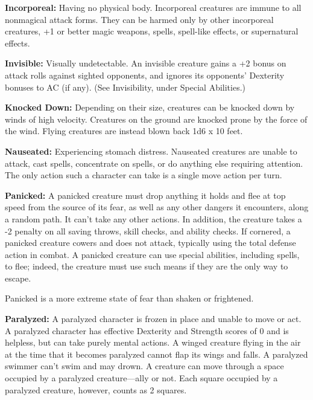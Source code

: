 \documentclass{article}
\begin{document}
\vspace{12pt}
\textbf{Incorporeal: }Having no physical body. Incorporeal creatures are immune 
to all nonmagical attack forms. They can be harmed only by other incorporeal creatures, 
+1 or better magic weapons, spells, spell-like effects, or supernatural effects. 

\vspace{12pt}
\textbf{Invisible:} Visually undetectable. An invisible creature gains a +2 bonus 
on attack rolls against sighted opponents, and ignores its opponents' Dexterity 
bonuses to AC (if any). (See Invisibility, under Special Abilities.)

\vspace{12pt}
\textbf{Knocked Down:} Depending on their size, creatures can be knocked down by 
winds of high velocity. Creatures on the ground are knocked prone by the force 
of the wind. Flying creatures are instead blown back 1d6 x 10 feet.

\vspace{12pt}
\textbf{Nauseated:} Experiencing stomach distress. Nauseated creatures are unable 
to attack, cast spells, concentrate on spells, or do anything else requiring attention. 
The only action such a character can take is a single move action per turn.

\vspace{12pt}
\textbf{Panicked: }A panicked creature must drop anything it holds and flee at 
top speed from the source of its fear, as well as any other dangers it encounters, 
along a random path. It can't take any other actions. In addition, the creature 
takes a -2 penalty on all saving throws, skill checks, and ability checks. If cornered, 
a panicked creature cowers and does not attack, typically using the total defense 
action in combat. A panicked creature can use special abilities, including spells, 
to flee; indeed, the creature must use such means if they are the only way to escape.

Panicked is a more extreme state of fear than shaken or frightened.

\vspace{12pt}
\textbf{Paralyzed:} A paralyzed character is frozen in place and unable to move 
or act. A paralyzed character has effective Dexterity and Strength scores of 0 
and is helpless, but can take purely mental actions. A winged creature flying in 
the air at the time that it becomes paralyzed cannot flap its wings and falls. 
A paralyzed swimmer can't swim and may drown. A creature can move through a space 
occupied by a paralyzed creature---ally or not. Each square occupied by a paralyzed 
creature, however, counts as 2 squares.
\end{document}
